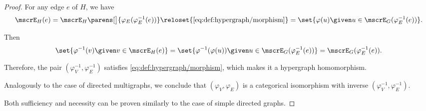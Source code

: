 \begin{proof}
  For any edge \( e \) of \( H \), we have
  \begin{equation*}
    \mscrE_H(e)
    =
    \mscrE_H\parens[\big]{ \varphi_E(\varphi_E^{-1}(e)) }
    \reloset {\eqref{eq:def:hypergraph/morphism}} =
    \set{ \varphi(u) \given u \in \mscrE_G(\varphi_E^{-1}(e)) }.
  \end{equation*}

  Then
  \begin{equation*}
    \set{ \varphi^{-1}(v) \given v \in \mscrE_H(e) }
    =
    \set{ \varphi^{-1}(\varphi(u)) \given u \in \mscrE_G(\varphi_E^{-1}(e)) }
    =
    \mscrE_G(\varphi_E^{-1}(e)).
  \end{equation*}

  Therefore, the pair \( (\varphi_V^{-1}, \varphi_E^{-1}) \) satisfies \eqref{eq:def:hypergraph/morphism}, which makes it a hypergraph homomorphism.

  Analogously to the case of directed multigraphs, we conclude that \( (\varphi_V, \varphi_E) \) is a categorical isomorphism with inverse \( (\varphi_V^{-1}, \varphi_E^{-1}) \).

   Both sufficiency and necessity can be proven similarly to the case of simple directed graphs.
\end{proof}

